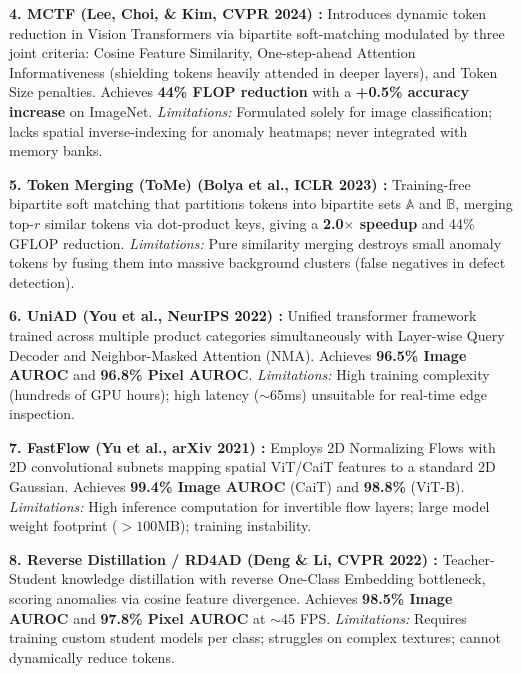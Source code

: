\documentclass[10pt,journal,compsoc]{IEEEtran}
\begin{document}
\noindent \textbf{4. MCTF (Lee, Choi, \& Kim, CVPR 2024) \cite{lee2024multi}:} Introduces dynamic token reduction in Vision Transformers via bipartite soft-matching modulated by three joint criteria: Cosine Feature Similarity, One-step-ahead Attention Informativeness (shielding tokens heavily attended in deeper layers), and Token Size penalties. Achieves \textbf{44\% FLOP reduction} with a \textbf{+0.5\% accuracy increase} on ImageNet. \textit{Limitations:} Formulated solely for image classification; lacks spatial inverse-indexing for anomaly heatmaps; never integrated with memory banks.

\noindent \textbf{5. Token Merging (ToMe) (Bolya et al., ICLR 2023) \cite{bolya2023tome}:} Training-free bipartite soft matching that partitions tokens into bipartite sets $\mathbb{A}$ and $\mathbb{B}$, merging top-$r$ similar tokens via dot-product keys, giving a \textbf{2.0$\times$ speedup} and 44\% GFLOP reduction. \textit{Limitations:} Pure similarity merging destroys small anomaly tokens by fusing them into massive background clusters (false negatives in defect detection).

\noindent \textbf{6. UniAD (You et al., NeurIPS 2022) \cite{you2022uniad}:} Unified transformer framework trained across multiple product categories simultaneously with Layer-wise Query Decoder and Neighbor-Masked Attention (NMA). Achieves \textbf{96.5\% Image AUROC} and \textbf{96.8\% Pixel AUROC}. \textit{Limitations:} High training complexity (hundreds of GPU hours); high latency ($\sim$65ms) unsuitable for real-time edge inspection.

\noindent \textbf{7. FastFlow (Yu et al., arXiv 2021) \cite{yu2021fastflow}:} Employs 2D Normalizing Flows with 2D convolutional subnets mapping spatial ViT/CaiT features to a standard 2D Gaussian. Achieves \textbf{99.4\% Image AUROC} (CaiT) and \textbf{98.8\%} (ViT-B). \textit{Limitations:} High inference computation for invertible flow layers; large model weight footprint ($>100\text{MB}$); training instability.

\noindent \textbf{8. Reverse Distillation / RD4AD (Deng \& Li, CVPR 2022) \cite{deng2022anomaly}:} Teacher-Student knowledge distillation with reverse One-Class Embedding bottleneck, scoring anomalies via cosine feature divergence. Achieves \textbf{98.5\% Image AUROC} and \textbf{97.8\% Pixel AUROC} at $\sim$45 FPS. \textit{Limitations:} Requires training custom student models per class; struggles on complex textures; cannot dynamically reduce tokens.
\end{document}
